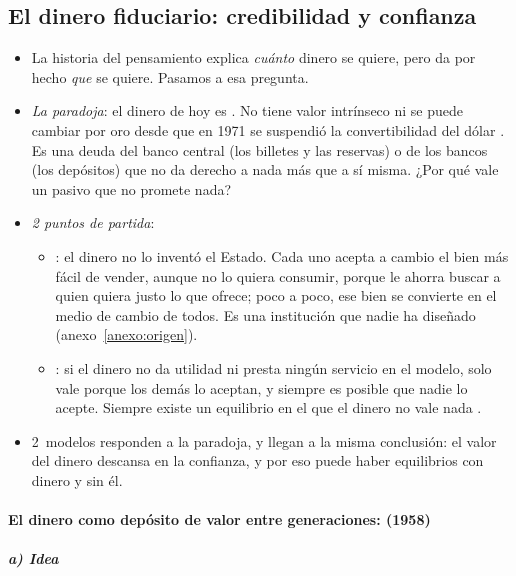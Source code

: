 \documentclass[11pt]{article}
\begin{document}
\subsection{El dinero fiduciario: credibilidad y confianza}\label{sec:fiduciario}

\begin{itemize}
\item La historia del pensamiento explica \emph{cuánto} dinero se quiere, pero da por hecho \emph{que} se quiere. Pasamos a esa pregunta.
\item \emph{La paradoja}: el dinero de hoy es . No tiene valor intrínseco ni se puede cambiar por oro desde que en 1971 se suspendió la convertibilidad del dólar . Es una deuda del banco central (los billetes y las reservas) o de los bancos (los depósitos) que no da derecho a nada más que a sí misma\nocite{McLeayRadiaThomas2014Money}. ¿Por qué vale un pasivo que no promete nada?
\item \emph{2 puntos de partida}:
  \begin{itemize}
  \item \textcite{Menger1892Origin}: el dinero no lo inventó el Estado. Cada uno acepta a cambio el bien más fácil de vender, aunque no lo quiera consumir, porque le ahorra buscar a quien quiera justo lo que ofrece; poco a poco, ese bien se convierte en el medio de cambio de todos. Es una institución que nadie ha diseñado  (anexo~\ref{anexo:origen}).
  \item \textcite{Hahn1965Problems}: si el dinero no da utilidad ni presta ningún servicio en el modelo, solo vale porque los demás lo aceptan, y siempre es posible que nadie lo acepte. Siempre existe un equilibrio en el que el dinero no vale nada .
  \end{itemize}
\item 2~modelos responden a la paradoja, y llegan a la misma conclusión: el valor del dinero descansa en la confianza, y por eso puede haber equilibrios con dinero y sin él.
\end{itemize}

\paragraph{El dinero como depósito de valor entre generaciones:  (1958)}

\subparagraph{a) Idea}
\end{document}

